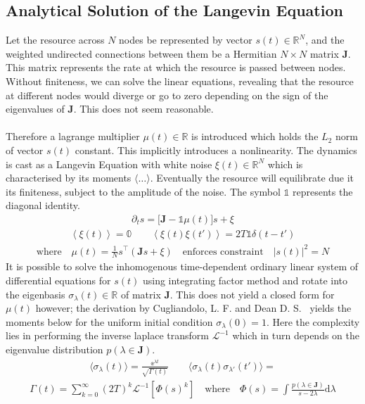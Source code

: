 \documentclass{article}[12pt]
\numberwithin{equation}{section}
\begin{document}
\subsection{Analytical Solution of the Langevin Equation}
Let the resource across $N$ nodes be represented by vector $s(t)\in\mathbb{R}^N$,
and the weighted undirected connections between them be a Hermitian $N\times N$ matrix
$\mathbf{J}$. This matrix represents the rate at which the resource is passed between
nodes. Without finiteness, we can solve the linear equations, revealing that
the resource at different nodes would diverge or go to zero depending on the sign
of the eigenvalues of $\mathbf{J}$. This does not seem reasonable.
\\\\
Therefore a
lagrange multiplier $\mu(t)\in\mathbb{R}$ is introduced which holds the $L_2$
norm of vector $s(t)$ constant. This implicitly introduces a nonlinearity. The
dynamics is cast as a Langevin Equation with white noise $\xi(t)\in\mathbb{R}^N$
which is characterised by its moments $\langle\dots\rangle$. Eventually the resource
will equilibrate due it its finiteness, subject to the amplitude of the noise.
The symbol $\mathbb{1}$ represents the diagonal identity.
\begin{align}
  \partial_t s = \big[\mathbf{J}-\mathbb{1}\mu(t)\big]s+\xi
\end{align}
\vspace{-40}
\begin{align}
  \left\langle\xi(t)\right\rangle=\mathbb{0}\qquad
  \left\langle\xi(t)\xi(t')\right\rangle=2T\mathbb{1}\delta(t-t')
\end{align}
\vspace{-40}
\begin{align}
\text{where}\quad\mu(t) = \frac{1}{N}s^{\top}\left(\mathbf{J}s+\xi\right)
\quad\text{enforces constraint}\quad|s(t)|^2=N
\label{eq:constraint}
\end{align}
It is possible to solve the inhomogenous time-dependent ordinary linear system of
differential equations for $s(t)$ using integrating factor method and rotate
into the eigenbasis $\sigma_{\lambda}(t)\in\mathbb{R}$ of matrix $\mathbf{J}$. This does not
yield a closed form for $\mu(t)$ however; the derivation by Cugliandolo, L. F.
and Dean D. S.~\cite{} yields the moments below for the uniform
initial condition $\sigma_{\lambda}(0)=1$. Here the complexity lies in performing
the inverse laplace transform $\mathcal{L}^{-1}$ which in turn depends on the
eigenvalue distribution $p(\lambda\in\mathbf{J})$.
\begin{align}
  \langle \sigma_{\lambda}(t)\rangle=
    \frac{\mathbb{e}^{\lambda t}}{\sqrt{\Gamma(t)}}\qquad
  \langle \sigma_{\lambda}(t)\sigma_{\lambda'}(t')\rangle=
\end{align}
\vspace{-30}
\begin{align}
  \Gamma(t)=
    \sum_{k=0}^{\infty}(2T)^k
    \mathcal{L}^{-1}\left[\Phi(s)^k\right]\quad\text{where}
    \quad
    \Phi(s)=\int\frac{p(\lambda\in\mathbf{J})}{s-2\lambda}\mathrm{d}\lambda
    \label{eq:gamma}
\end{align}
\pagebreak
\end{document}
